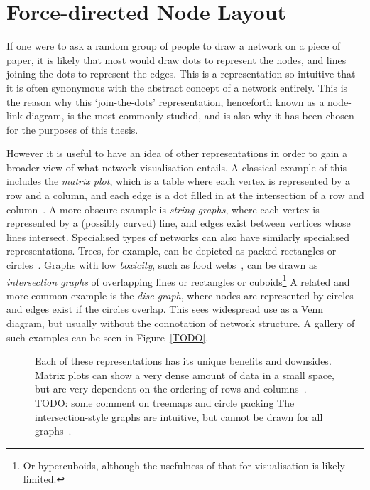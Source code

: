 \chapter{Force-directed Node Layout}
If one were to ask a random group of people to draw a network on a piece of paper, it is likely that most would draw dots to represent the nodes, and lines joining the dots to represent the edges. This is a representation so intuitive that it is often synonymous with the abstract concept of a network entirely.
This is the reason why this `join-the-dots' representation, henceforth known as a node-link diagram, is the most commonly studied, and is also why it has been chosen for the purposes of this thesis.

However it is useful to have an idea of other representations in order to gain a broader view of what network visualisation entails. A classical example of this includes the \emph{matrix plot}, which is a table where each vertex is represented by a row and a column, and each edge is a dot filled in at the intersection of a row and column~\cite{TODO}.
A more obscure example is \emph{string graphs}, where each vertex is represented by a (possibly curved) line, and edges exist between vertices whose lines intersect.
Specialised types of networks can also have similarly specialised representations. Trees, for example, can be depicted as packed rectangles or circles~\cite{TODO}.
Graphs with low \emph{boxicity}, such as food webs~\cite{TODO}, can be drawn as \emph{intersection graphs} of overlapping lines or rectangles or cuboids\footnote{Or hypercuboids, although the usefulness of that for visualisation is likely limited.}
A related and more common example is the \emph{disc graph}, where nodes are represented by circles and edges exist if the circles overlap. This sees widespread use as a Venn diagram, but usually without the connotation of network structure.
A gallery of such examples can be seen in Figure~\ref{TODO}.

\begin{figure}
\caption{ Each of these representations has its unique benefits and downsides. Matrix plots can show a very dense amount of data in a small space, but are very dependent on the ordering of rows and columns~\cite{TODO}.
TODO: some comment on treemaps and circle packing
The intersection-style graphs are intuitive, but cannot be drawn for all graphs~\cite{TODO}. }
\label{graphrepresentations}
\end{figure}

